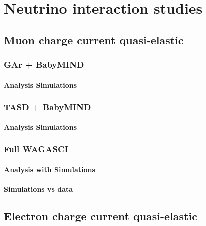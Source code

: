 \chapter{Neutrino interaction studies}
\label{c:neutrino}

\section{Muon charge current quasi-elastic}
\subsection{GAr + BabyMIND}
\subsubsection{Analysis Simulations}
\subsection{TASD + BabyMIND}
\subsubsection{Analysis Simulations}
\subsection{Full WAGASCI}
\subsubsection{Analysis with Simulations}
\subsubsection{Simulations vs data}

\section{Electron charge current quasi-elastic}